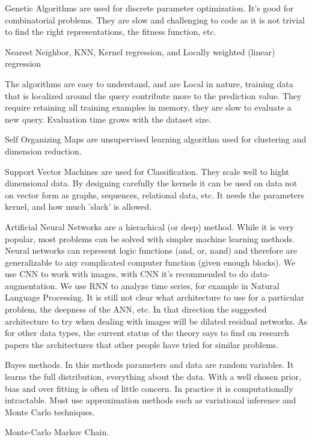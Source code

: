 \documentclass[11pt,letterpaper]{report}
\begin{document}
Genetic Algorithms are used for discrete parameter optimization. It's good for combinatorial problems.
They are slow and  challenging to code as it is not trivial to  find the right representations, the fitness function, etc.




Nearest Neighbor, KNN, Kernel regression, and Locally weighted (linear) regression

The algorithms are easy to understand, and are Local in nature, training data that is localized around the query contribute more to the prediction value.
They require retaining all training examples in memory, they are slow to evaluate a new query. Evaluation time grows with the dataset size.

Self Organizing Maps are unsupervised learning algorithm used for clustering and dimension reduction.


Support Vector Machines are used for Classification.
They scale well to hight dimensional data.
By designing carefully the kernels it can be used on data not on vector form as graphs, sequences, relational data, etc. It needs the parameters kernel, and how much 'slack' is allowed.


Artificial Neural Networks are a hierachical (or deep) method. While it is very popular, most problems can be solved with simpler machine learning methods\cite{Gron}. Neural networks can represent logic functions (and, or, nand) and therefore are generalizable to any complicated computer function (given enough blocks). We use CNN to work with images, with CNN it's recommended to do data-augmentation. We use RNN to analyze time series, for example in Natural Language Processing.
It is still not clear what architecture\cite{Lin2017} to use for a particular problem,   the deepness of the ANN, etc. In that direction the suggested architecture to try when dealing with images will be dilated residual networks\cite{DRN}. As for other data types, the current status of the theory says to find on research papers the architectures that other people have tried for similar problems.


Bayes methods. In this methods parameters and data are random variables. It learns the full distribution, everything about the data. With a well chosen prior, bias and over fitting is often of little concern. In practice it is computationally intractable. Must use approximation methods such as variational inference and Monte Carlo techniques.

Monte-Carlo Markov Chain.
\end{document}
